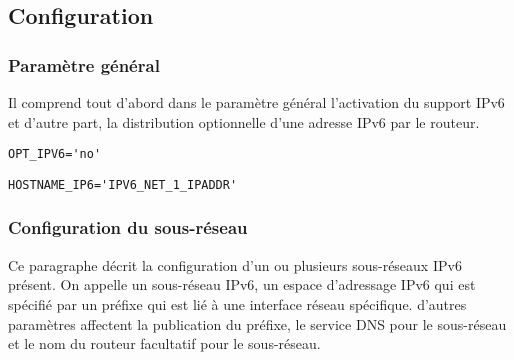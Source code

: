 \subsection{Configuration}

\subsubsection{Paramètre général}

Il comprend tout d'abord dans le paramètre général l'activation du support IPv6 et d'autre part,
la distribution optionnelle d'une adresse IPv6 par le routeur.

\begin{description}
\verb*?OPT_IPV6='no'?

\verb*?HOSTNAME_IP6='IPV6_NET_1_IPADDR'?
\end{description}

\subsubsection{Configuration du sous-réseau}

Ce paragraphe décrit la configuration d'un ou plusieurs sous-réseaux IPv6 présent. On appelle
un sous-réseau IPv6, un espace d'adressage IPv6 qui est spécifié par un préfixe qui est lié
à une interface réseau spécifique. d'autres paramètres affectent la publication du préfixe,
le service DNS pour le sous-réseau et le nom du routeur facultatif pour le sous-réseau.

